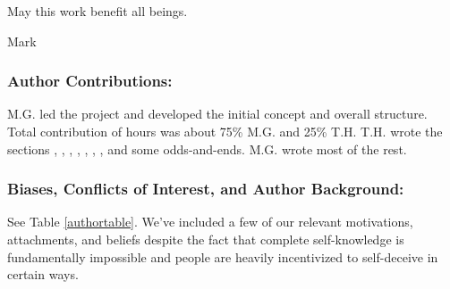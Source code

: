 \documentclass[12pt,letterpaper]{book}
\begin{document}
May this work benefit all beings.

Mark


\subsubsection{Author Contributions:} M.G. led the project and developed the initial concept and overall structure. Total contribution of hours was about 75\% M.G. and 25\% T.H. T.H. wrote the sections , , , , , , , and some odds-and-ends. M.G. wrote most of the rest.

\subsubsection{Biases, Conflicts of Interest, and Author Background:}
See Table \ref{authortable}. We've included a few of our relevant motivations, attachments, and beliefs despite the fact that complete self-knowledge is fundamentally impossible and people are heavily incentivized to self-deceive in certain ways.
\FloatBarrier
\end{document}

